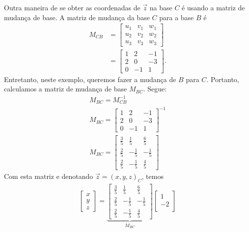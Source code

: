 \begin{ex}
Outra maneira de se obter as coordenadas de $\vec{z}$ na base $C$ é usando a matriz de mudança de base. A matriz de mudança da base $C$ para a base $B$ é
\begin{align}
  M_{CB} &= \begin{bmatrix}
    u_1 & v_1 & w_1 \\
    u_2 & v_2 & w_2 \\
    u_3 & v_3 & w_3
  \end{bmatrix} \\
         &=
  \begin{bmatrix}
    1 & 2 & -1\\
    2 & 0 & -3\\
    0 & -1 & 1
  \end{bmatrix}.
\end{align}
Entretanto, neste exemplo, queremos fazer a mudança de $B$ para $C$. Portanto, calculamos a matriz de mudança de base $M_{BC}$. Segue:
\begin{gather}
  M_{BC} = M_{CB}^{-1} \\
  M_{BC} =
  \begin{bmatrix}
    1 & 2 & -1\\
    2 & 0 & -3\\
    0 & -1 & 1
  \end{bmatrix}^{-1} \\
  M_{BC} = 
  \begin{bmatrix}
    \frac{3}{5} & \frac{1}{5} & \frac{6}{5}\\
    \frac{2}{5} & -\frac{1}{5} & -\frac{1}{5}\\
    \frac{2}{5} & -\frac{1}{5} & \frac{4}{5}
  \end{bmatrix}
\end{gather}
Com esta matriz e denotando $\vec{z}=(x,y,z)_C$, temos
\begin{gather}
  \begin{bmatrix}
    x\\
    y\\
    z
  \end{bmatrix} = 
  \underbrace{\begin{bmatrix}
    \frac{3}{5} & \frac{1}{5} & \frac{6}{5}\\
    \frac{2}{5} & -\frac{1}{5} & -\frac{1}{5}\\
    \frac{2}{5} & -\frac{1}{5} & \frac{4}{5}
  \end{bmatrix}}_{M_{BC}}
  \begin{bmatrix}
    1\\
    -2\\

\end{bmatrix}
\end{gather}
\end{ex}
